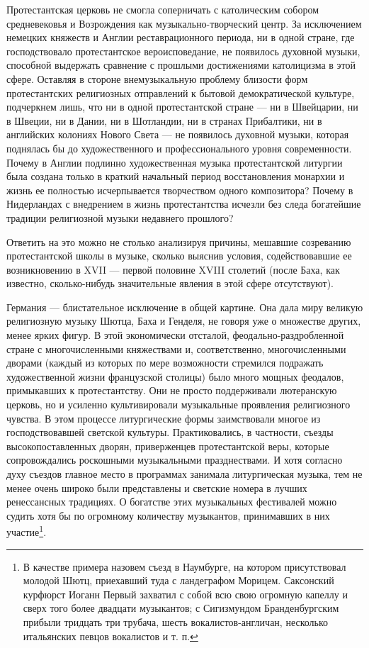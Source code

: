 Протестантская церковь  не смогла  соперничать с  католическим собором
средневековья  и  Возрождения   как  музыкально-творческий  центр.  За
исключением немецких  княжеств и  Англии реставрационного  периода, ни
в  одной стране,  где  господствовало протестантское  вероисповедание,
не  появилось   духовной  музыки,  способной  выдержать   сравнение  с
прошлыми  достижениями католицизма  в этой  сфере. Оставляя  в стороне
внемузыкальную  проблему  близости   форм  протестантских  религиозных
отправлений  к  бытовой  демократической  культуре,  подчеркнем  лишь,
что  ни  в одной  протестантской  стране  ---  ни  в Швейцарии,  ни  в
Швеции,  ни  в  Дании,  ни  в  Шотландии,  ни  в  странах  Прибалтики,
ни  в  английских колониях  Нового  Света  --- не  появилось  духовной
музыки, которая  поднялась бы  до художественного  и профессионального
уровня современности.  Почему в Англии подлинно  художественная музыка
протестантской  литургии  была  создана  только  в  краткий  начальный
период  восстановления монархии  и  жизнь  ее полностью  исчерпывается
творчеством одного  композитора? Почему  в Нидерландах с  внедрением в
жизнь протестантства исчезли без следа богатейшие традиции религиозной
музыки недавнего прошлого?

Ответить  на  это  можно   не  столько  анализируя  причины,  мешавшие
созреванию  протестантской школы  в музыке,  сколько выяснив  условия,
содействовавшие  ее возникновению  в  XVII ---  первой половине  XVIII
столетий  (после  Баха,   как  известно,  сколько-нибудь  значительные
явления в этой сфере отсутствуют).

Германия  ---  блистательное  исключение  в общей  картине.  Она  дала
миру  великую религиозную  музыку  Шютца, Баха  и  Генделя, не  говоря
уже  о  множестве  других,  менее ярких  фигур.  В  этой  экономически
отсталой, феодально-раздробленной стране с многочисленными княжествами
и,   соответственно,  многочисленными   дворами  (каждый   из  которых
по   мере  возможности   стремился   подражать  художественной   жизни
французской  столицы)  было  много   мощных  феодалов,  примыкавших  к
протестантству.  Они  не   просто  поддерживали  лютеранскую  церковь,
но  и  усиленно  культивировали  музыкальные  проявления  религиозного
чувства.  В  этом  процессе литургические  формы  заимствовали  многое
из  господствовавшей светской  культуры. Практиковались,  в частности,
съезды  высокопоставленных дворян,  приверженцев протестантской  веры,
которые  сопровождались   роскошными  музыкальными   празднествами.  И
хотя  согласно  духу  съездов  главное  место  в  программах  занимала
литургическая музыка,  тем не менее  очень широко были  представлены и
светские  номера в  лучших  ренессансных традициях.  О богатстве  этих
музыкальных фестивалей  можно судить  хотя бы по  огромному количеству
музыкантов,  принимавших  в  них участие\footnote{В  качестве  примера
назовем  съезд в  Наумбурге,  на котором  присутствовал молодой  Шютц,
приехавший  туда с  ландеграфом  Морицем.  Саксонский курфюрст  Иоганн
Первый захватил с  собой всю свою огромную капеллу и  сверх того более
двадцати  музыкантов; с  Сигизмундом Бранденбургским  прибыли тридцать
три трубача,  шесть вокалистов-англичан, несколько  итальянских певцов
вокалистов и т. п.}.

